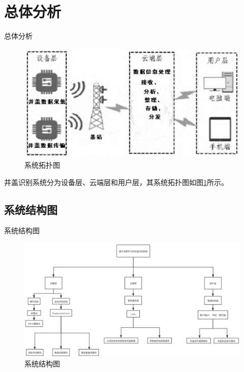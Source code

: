 \documentclass{beamer}
\begin{document}
\section{总体分析}
\begin{frame}{总体分析}
    \begin{minipage}{0.3\linewidth}
        \medskip
        \begin{figure}[h]
            \centering
            \includegraphics[height=.4\textheight]{tpt.png}
            \caption{系统拓扑图}
            \label{系统拓扑图}
        \end{figure}
    \end{minipage}\hspace{4cm}
    \begin{minipage}[c]{0.3\linewidth}
井盖识别系统分为设备层、云端层和用户层，其系统拓扑图如图\ref{系统拓扑图}所示。
\end{minipage}
\end{frame}
\subsection{系统结构图}
\begin{frame}{系统结构图}
      \begin{figure}[h]
            \centering
            \includegraphics[height=.7\textheight]{Picture/stjg.png}
            \caption{系统结构图}
            \label{系统结构图}
        \end{figure}
\end{frame}
\end{document}

